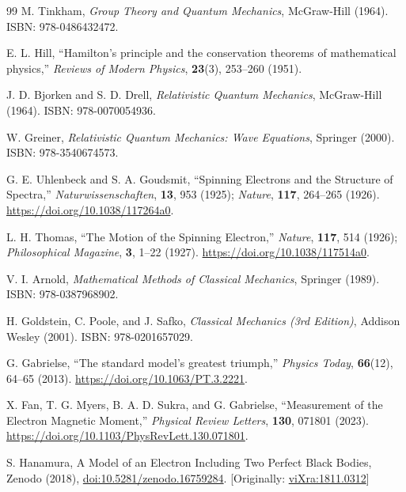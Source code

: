 \documentclass[%
 reprint,
 amsmath,amssymb,
 aps,
]{revtex4-1}
\numberwithin{equation}{section}%
\begin{document}
\begin{thebibliography}{99}
M. Tinkham, \textit{Group Theory and Quantum Mechanics}, McGraw-Hill (1964). ISBN: 978-0486432472.

E. L. Hill, ``Hamilton's principle and the conservation theorems of mathematical physics,'' \textit{Reviews of Modern Physics}, \textbf{23}(3), 253--260 (1951).

J. D. Bjorken and S. D. Drell, \textit{Relativistic Quantum Mechanics}, McGraw-Hill (1964). ISBN: 978-0070054936.

W. Greiner, \textit{Relativistic Quantum Mechanics: Wave Equations}, Springer (2000). ISBN: 978-3540674573.

G. E. Uhlenbeck and S. A. Goudsmit, ``Spinning Electrons and the Structure of Spectra,'' \textit{Naturwissenschaften}, \textbf{13}, 953 (1925); \textit{Nature}, \textbf{117}, 264--265 (1926). \href{https://www.ffn.ub.es/luisnavarro/nuevo_maletin/Uhlenbeck_Goudsmit_1926.pdf}{https://doi.org/10.1038/117264a0}.

L. H. Thomas, ``The Motion of the Spinning Electron,'' \textit{Nature}, \textbf{117}, 514 (1926); \textit{Philosophical Magazine}, \textbf{3}, 1--22 (1927). \href{https://www.nature.com/articles/117514a0}{https://doi.org/10.1038/117514a0}.

V. I. Arnold, \textit{Mathematical Methods of Classical Mechanics}, Springer (1989). ISBN: 978-0387968902.

H. Goldstein, C. Poole, and J. Safko, \textit{Classical Mechanics (3rd Edition)}, Addison Wesley (2001). ISBN: 978-0201657029.

G. Gabrielse, ``The standard model's greatest triumph,'' \textit{Physics Today}, \textbf{66}(12), 64--65 (2013). \href{https://doi.org/10.1063/PT.3.2221}{https://doi.org/10.1063/PT.3.2221}.

X. Fan, T. G. Myers, B. A. D. Sukra, and G. Gabrielse, ``Measurement of the Electron Magnetic Moment,'' \textit{Physical Review Letters}, \textbf{130}, 071801 (2023). \href{https://doi.org/10.1103/PhysRevLett.130.071801}{https://doi.org/10.1103/PhysRevLett.130.071801}.


S. Hanamura, A Model of an Electron Including Two Perfect Black Bodies, Zenodo (2018), \href{https://doi.org/10.5281/zenodo.16759284}{doi:10.5281/zenodo.16759284}. [Originally: \href{https://vixra.org/abs/1811.0312}{viXra:1811.0312}]


\end{thebibliography}
\end{document}
